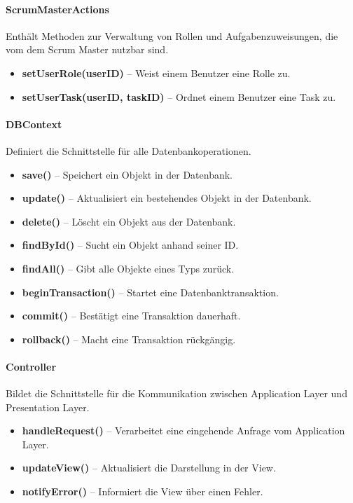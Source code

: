 \documentclass{article}
\begin{document}
\paragraph{ScrumMasterActions}
Enthält Methoden zur Verwaltung von Rollen und Aufgabenzuweisungen, die vom dem Scrum Master nutzbar sind.
\begin{itemize}
	\item \textbf{setUserRole(userID)} -- Weist einem Benutzer eine Rolle zu.
	\item \textbf{setUserTask(userID, taskID)} -- Ordnet einem Benutzer eine Task zu.
\end{itemize}

\paragraph{DBContext}
Definiert die Schnittstelle für alle Datenbankoperationen.
\begin{itemize}
	\item \textbf{save()} -- Speichert ein Objekt in der Datenbank.
	\item \textbf{update()} -- Aktualisiert ein bestehendes Objekt in der Datenbank.
	\item \textbf{delete()} -- Löscht ein Objekt aus der Datenbank.
	\item \textbf{findById()} -- Sucht ein Objekt anhand seiner ID.
	\item \textbf{findAll()} -- Gibt alle Objekte eines Typs zurück.
	\item \textbf{beginTransaction()} -- Startet eine Datenbanktransaktion.
	\item \textbf{commit()} -- Bestätigt eine Transaktion dauerhaft.
	\item \textbf{rollback()} -- Macht eine Transaktion rückgängig.
\end{itemize}

\paragraph{Controller}
Bildet die Schnittstelle für die Kommunikation zwischen Application Layer und Presentation Layer.
\begin{itemize}
	\item \textbf{handleRequest()} -- Verarbeitet eine eingehende Anfrage vom Application Layer.
	\item \textbf{updateView()} -- Aktualisiert die Darstellung in der View.
	\item \textbf{notifyError()} -- Informiert die View über einen Fehler.
\end{itemize}
\end{document}
